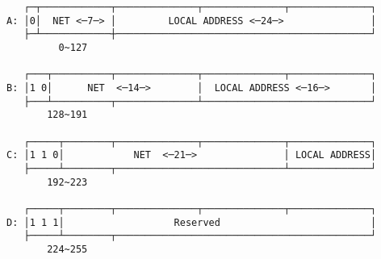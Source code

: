 \documentclass[varwidth=30cm,crop]{standalone}
\begin{document}
\begin{verbatim}
   ┌─┬────────────┬──────────────┬──────────────┬──────────────┐
A: │0│  NET <─7─> │         LOCAL ADDRESS <─24─>               │
   ├─┴────────────┼────────────────────────────────────────────┘
         0~127

   ┌───┬──────────┬──────────────┬──────────────┬──────────────┐  
B: │1 0│      NET  <─14─>        │  LOCAL ADDRESS <─16─>       │
   ├───┴──────────┬──────────────┴─────────────────────────────┘
       128~191

   ┌─────┬────────┬──────────────┬──────────────┬──────────────┐
C: │1 1 0│            NET  <─21─>               │ LOCAL ADDRESS│
   ├─────┴────────┬─────────────────────────────┴──────────────┘
       192~223

   ┌─────┬────────┬──────────────┬──────────────┬──────────────┐
D: │1 1 1│                   Reserved                          │
   ├─────┴────────┬────────────────────────────────────────────┘
       224~255
\end{verbatim}
\end{document}
